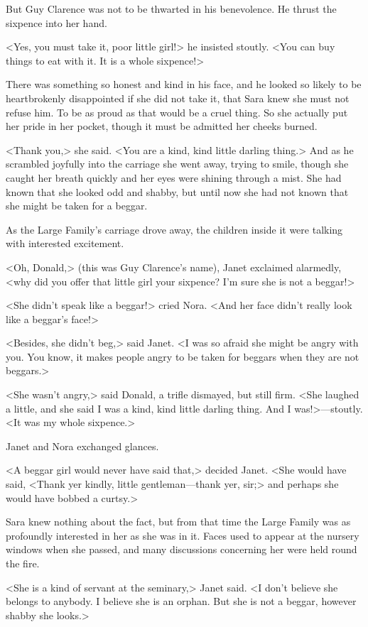 But Guy Clarence was not to be thwarted in his benevolence. He thrust the sixpence into her hand.

<Yes, you must take it, poor little girl!> he insisted stoutly. <You can buy things to eat with it. It is a whole sixpence!>

There was something so honest and kind in his face, and he looked so likely to be heartbrokenly disappointed if she did not take it, that Sara knew she must not refuse him. To be as proud as that would be a cruel thing. So she actually put her pride in her pocket, though it must be admitted her cheeks burned.

<Thank you,> she said. <You are a kind, kind little darling thing.> And as he scrambled joyfully into the carriage she went away, trying to smile, though she caught her breath quickly and her eyes were shining through a mist. She had known that she looked odd and shabby, but until now she had not known that she might be taken for a beggar.

As the Large Family's carriage drove away, the children inside it were talking with interested excitement.

<Oh, Donald,> (this was Guy Clarence's name), Janet exclaimed alarmedly, <why did you offer that little girl your sixpence? I'm sure she is not a beggar!>

<She didn't speak like a beggar!> cried Nora. <And her face didn't really look like a beggar's face!>

<Besides, she didn't beg,> said Janet. <I was so afraid she might be angry with you. You know, it makes people angry to be taken for beggars when they are not beggars.>

<She wasn't angry,> said Donald, a trifle dismayed, but still firm. <She laughed a little, and she said I was a kind, kind little darling thing. And I was!>—stoutly. <It was my whole sixpence.>

Janet and Nora exchanged glances.

<A beggar girl would never have said that,> decided Janet. <She would have said, <Thank yer kindly, little gentleman—thank yer, sir;> and perhaps she would have bobbed a curtsy.>

Sara knew nothing about the fact, but from that time the Large Family was as profoundly interested in her as she was in it. Faces used to appear at the nursery windows when she passed, and many discussions concerning her were held round the fire.

<She is a kind of servant at the seminary,> Janet said. <I don't believe she belongs to anybody. I believe she is an orphan. But she is not a beggar, however shabby she looks.>

